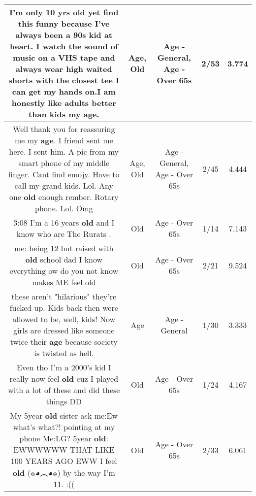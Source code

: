 \documentclass[11pt]{article}
\newlength\mylength
\begin{document}
\begin{center}
\begin{longtable}{|C{.65\mylength}|C{.30\mylength}|C{.12\mylength}|C{.12\mylength}|C{.12\mylength}|}
  \small I'm only 10 yrs \textbf{old} yet find this funny because I've always been a 90s kid at heart. I watch the sound of music on a VHS tape and  always wear high waited shorts with the closest tee I can get my hands on.I am honestly like adults better than kids my \textbf{age}.\normalsize   & Age, Old & Age - General, Age - Over 65s & 2/53 & 3.774 \\  \hline
  \small Well thank you for reassuring me my \textbf{age}.  I friend sent me here.    I sent him.  A pic from my smart phone of my middle finger.  Cant find emojy.  Have to call my grand kids.   Lol.  Any one \textbf{old} enough rember.  Rotary phone.   Lol. Omg\normalsize   & Age, Old & Age - General, Age - Over 65s & 2/45 & 4.444 \\  \hline
  \small 3:08 I'm a 16 years \textbf{old} and I know who are The Rurats .\normalsize   & Old & Age - Over 65s & 1/14 & 7.143 \\  \hline
  \small me: being 12 but raised with \textbf{old} school dad I know everything ow do you not know makes ME feel old\normalsize   & Old & Age - Over 65s & 2/21 & 9.524 \\  \hline
  \small these aren't "hilarious" they're fucked up. Kids back then were allowed to be, well, kids! Now girls are dressed like someone twice their \textbf{age} because society is twisted as hell.\normalsize   & Age & Age - General & 1/30 & 3.333 \\  \hline
  \small Even tho I'm a 2000's kid I really now feel \textbf{old} cuz I played with a lot of these and did these things DD\normalsize   & Old & Age - Over 65s & 1/24 & 4.167 \\  \hline
  \small My 5year \textbf{old} sister ask me:Ew what's what?! pointing at my phone Me:LG? 5year \textbf{old}: EWWWWWW THAT LIKE 100 YEARS AGO EWW I feel \textbf{old} (๑◕︵◕๑) by the way I'm 11. :((\normalsize   & Old & Age - Over 65s & 2/33 & 6.061 \\  \hline

\end{longtable}
\end{center}
\end{document}
